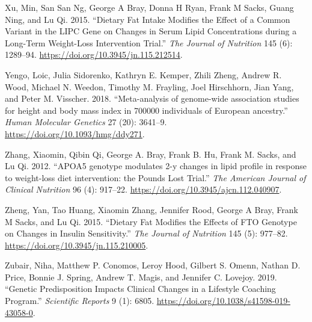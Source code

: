 \documentclass[]{article}
\begin{document}
\leavevmode\hypertarget{ref-Xu2015}{}%
Xu, Min, San San Ng, George A Bray, Donna H Ryan, Frank M Sacks, Guang
Ning, and Lu Qi. 2015. ``Dietary Fat Intake Modifies the Effect of a
Common Variant in the LIPC Gene on Changes in Serum Lipid Concentrations
during a Long-Term Weight-Loss Intervention Trial.'' \emph{The Journal
of Nutrition} 145 (6): 1289--94.
\url{https://doi.org/10.3945/jn.115.212514}.

\leavevmode\hypertarget{ref-Yengo2018}{}%
Yengo, Loic, Julia Sidorenko, Kathryn E. Kemper, Zhili Zheng, Andrew R.
Wood, Michael N. Weedon, Timothy M. Frayling, Joel Hirschhorn, Jian
Yang, and Peter M. Visscher. 2018. ``Meta-analysis of genome-wide
association studies for height and body mass index in 700000 individuals
of European ancestry.'' \emph{Human Molecular Genetics} 27 (20):
3641--9. \url{https://doi.org/10.1093/hmg/ddy271}.

\leavevmode\hypertarget{ref-Zhang2012}{}%
Zhang, Xiaomin, Qibin Qi, George A. Bray, Frank B. Hu, Frank M. Sacks,
and Lu Qi. 2012. ``APOA5 genotype modulates 2-y changes in lipid profile
in response to weight-loss diet intervention: the Pounds Lost Trial.''
\emph{The American Journal of Clinical Nutrition} 96 (4): 917--22.
\url{https://doi.org/10.3945/ajcn.112.040907}.

\leavevmode\hypertarget{ref-Zheng2015}{}%
Zheng, Yan, Tao Huang, Xiaomin Zhang, Jennifer Rood, George A Bray,
Frank M Sacks, and Lu Qi. 2015. ``Dietary Fat Modifies the Effects of
FTO Genotype on Changes in Insulin Sensitivity.'' \emph{The Journal of
Nutrition} 145 (5): 977--82.
\url{https://doi.org/10.3945/jn.115.210005}.

\leavevmode\hypertarget{ref-Zubair2019}{}%
Zubair, Niha, Matthew P. Conomos, Leroy Hood, Gilbert S. Omenn, Nathan
D. Price, Bonnie J. Spring, Andrew T. Magis, and Jennifer C. Lovejoy.
2019. ``Genetic Predisposition Impacts Clinical Changes in a Lifestyle
Coaching Program.'' \emph{Scientific Reports} 9 (1): 6805.
\url{https://doi.org/10.1038/s41598-019-43058-0}.
\end{document}
